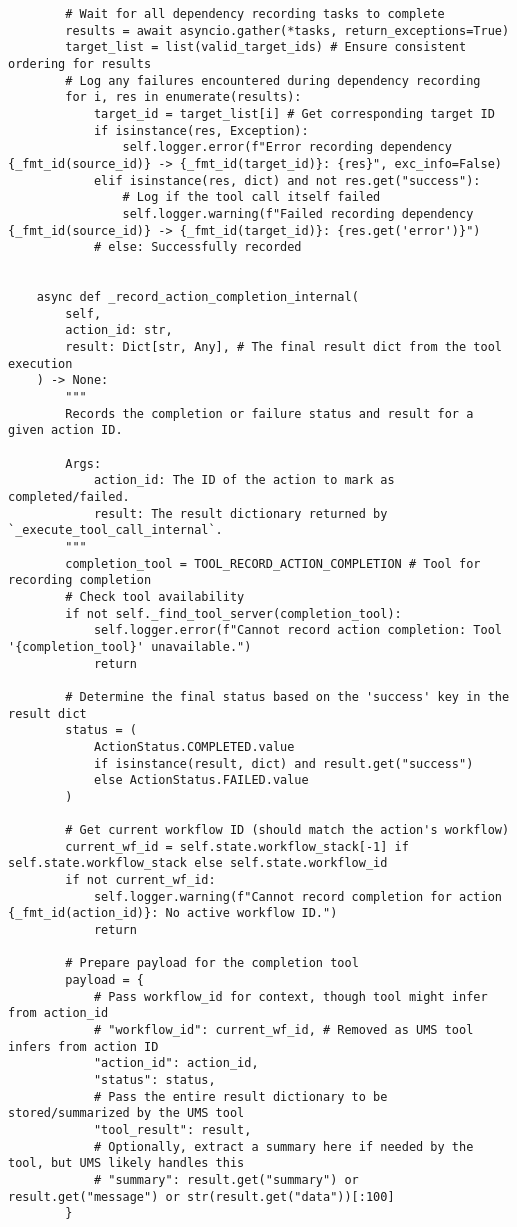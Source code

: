 \documentclass[12pt,a4paper]{article}
\begin{document}
\begin{pageablecode}
\begin{verbatim}
        # Wait for all dependency recording tasks to complete
        results = await asyncio.gather(*tasks, return_exceptions=True)
        target_list = list(valid_target_ids) # Ensure consistent ordering for results
        # Log any failures encountered during dependency recording
        for i, res in enumerate(results):
            target_id = target_list[i] # Get corresponding target ID
            if isinstance(res, Exception):
                self.logger.error(f"Error recording dependency {_fmt_id(source_id)} -> {_fmt_id(target_id)}: {res}", exc_info=False)
            elif isinstance(res, dict) and not res.get("success"):
                # Log if the tool call itself failed
                self.logger.warning(f"Failed recording dependency {_fmt_id(source_id)} -> {_fmt_id(target_id)}: {res.get('error')}")
            # else: Successfully recorded


    async def _record_action_completion_internal(
        self,
        action_id: str,
        result: Dict[str, Any], # The final result dict from the tool execution
    ) -> None:
        """
        Records the completion or failure status and result for a given action ID.

        Args:
            action_id: The ID of the action to mark as completed/failed.
            result: The result dictionary returned by `_execute_tool_call_internal`.
        """
        completion_tool = TOOL_RECORD_ACTION_COMPLETION # Tool for recording completion
        # Check tool availability
        if not self._find_tool_server(completion_tool):
            self.logger.error(f"Cannot record action completion: Tool '{completion_tool}' unavailable.")
            return

        # Determine the final status based on the 'success' key in the result dict
        status = (
            ActionStatus.COMPLETED.value
            if isinstance(result, dict) and result.get("success")
            else ActionStatus.FAILED.value
        )

        # Get current workflow ID (should match the action's workflow)
        current_wf_id = self.state.workflow_stack[-1] if self.state.workflow_stack else self.state.workflow_id
        if not current_wf_id:
            self.logger.warning(f"Cannot record completion for action {_fmt_id(action_id)}: No active workflow ID.")
            return

        # Prepare payload for the completion tool
        payload = {
            # Pass workflow_id for context, though tool might infer from action_id
            # "workflow_id": current_wf_id, # Removed as UMS tool infers from action ID
            "action_id": action_id,
            "status": status,
            # Pass the entire result dictionary to be stored/summarized by the UMS tool
            "tool_result": result,
            # Optionally, extract a summary here if needed by the tool, but UMS likely handles this
            # "summary": result.get("summary") or result.get("message") or str(result.get("data"))[:100]
        }


\end{verbatim}
\end{pageablecode}
\end{document}
